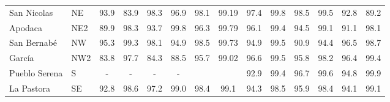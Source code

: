 \begin{table}[H]
\begin{tabular}{llcccccccccccc}
San Nicolas                                                                                  & NE                                         & 93.9       & 83.9      & 98.3       & 96.9       & 98.1                                                 & 99.19                                                & 97.4        & 99.8       & 98.5  & 99.5                                                 & 92.8                                                & 89.2 \\
Apodaca                                                                                      & NE2                                        & 89.9       & 98.3      & 93.7       & 99.8       & 96.3                                                 & 99.79                                                & 96.1        & 99.4       & 94.5  & 99.1                                                 & 91.1                                                & 98.1 \\
San Bernabé                                                                                       & NW                                         & 95.3       & 99.3      & 98.1       & 94.9       & 98.5                                                 & 99.73                                                & 94.9        & 99.5       & 90.9  & 94.4                                                 & 96.5                                                & 98.7 \\
García                                                                                  & NW2                                        & 83.8       & 97.7      & 84.3       & 88.5       & 95.7                                                 & 99.02                                                & 96.6        & 99.5       & 95.8  & 98.2                                                 & 96.4                                                & 99.4 \\
Pueblo Serena                                                                                & S                                          & -          & -         & -          & -          & \cellcolor[HTML]{CB0000}{\color[HTML]{FFFFFF} 22.8}  & \cellcolor[HTML]{CB0000}{\color[HTML]{FFFFFF} 23.69} & 92.9        & 99.4       & 96.7  & 99.6                                                 & 94.8                                                & 99.9 \\
La Pastora                                                                                   & SE                                         & 92.8       & 98.6      & 97.2       & 99.0       & 98.4                                                 & 99.1                                                 & 94.3        & 98.5       & 95.9  & 98.4                                                 & 94.1                                                & 99.1 \\

\end{tabular}
\end{table}
